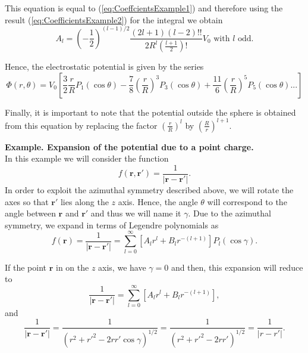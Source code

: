 This equation is equal to (\ref{eq:CoeffcientsExample1}) and therefore using the result (\ref{eq:CoefficientsExample2}) for the integral we obtain
\begin{equation}
A_l = \left( -\frac{1}{2}\right)^{(l-1)/2} \frac{(2l+1)(l-2)!!}{2R^l \left( \frac{l+1}{2}\right)!}V_0 \text{ with } l \text{ odd}.
\end{equation}

Hence, the electrostatic potential is given by the series
\begin{equation}
\Phi (r, \theta) = V_0 \left[ \frac{3}{2} \frac{r}{R} P_1 (\cos \theta ) - \frac{7}{8}  \left( \frac{r}{R} \right)^3 P_3 (\cos \theta) + \frac{11}{6} \left( \frac{r}{R} \right)^5 P_5 (\cos \theta ) ...  \right]
\end{equation}

Finally, it is important to note that  the potential outside the sphere is obtained from this equation by replacing the factor $\left( \frac{r}{R} \right)^l$ by $\left( \frac{R}{r} \right)^{l+1}$.
\bigskip

\textbf{Example. Expansion of the potential due to a point charge.}\\
In this example we will consider the function 
\begin{equation}
f(\textbf{r}, \textbf{r}')= \frac{1}{\left| \textbf{r} - \textbf{r}' \right|}. 
\end{equation}
In order to exploit the azimuthal symmetry described above, we will rotate the axes so that $\textbf{r}'$ lies along the $z$ axis. Hence, the angle $\theta$ will correspond to the angle between $\textbf{r}$ and $\textbf{r}'$ and thus we will name it $\gamma$. Due to the azimuthal symmetry, we expand in terms of Legendre polynomials as
\begin{equation}
f(\textbf{r}) =  \frac{1}{\left| \textbf{r} - \textbf{r}' \right|} = \sum_{l=0} ^\infty \left[ A_l r^l + B_l r^{-(l+1)} \right] P_l (\cos \gamma).
 \end{equation} 

If the point  $\textbf{r}$ in on the $z$ axis, we have $\gamma = 0$ and then, this expansion will reduce to 
\begin{equation}
  \frac{1}{\left| \textbf{r} - \textbf{r}' \right|} = \sum_{l=0} ^\infty \left[ A_l r^l + B_l r^{-(l+1)} \right],
 \end{equation} 
and 
\begin{equation}
\frac{1}{\left| \textbf{r} - \textbf{r}' \right|}  = \frac{1}{\left( r^2 +r'^2 - 2rr' \cos \gamma \right)^{1/2}} = \frac{1}{\left( r^2 +r'^2 - 2rr' \right)^{1/2}}  = \frac{1}{\left| r - r' \right|} .
\end{equation}

